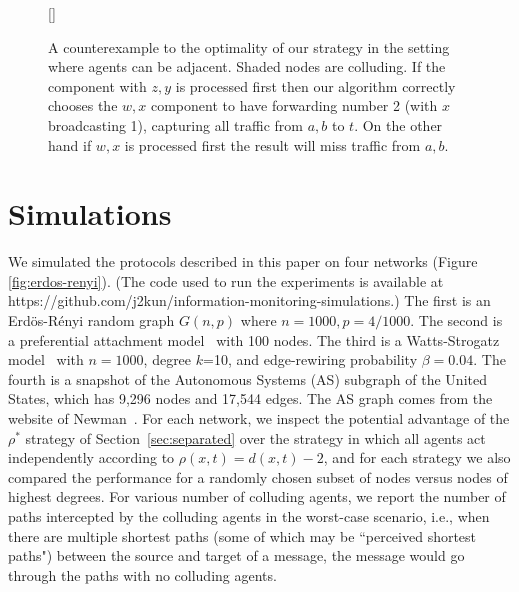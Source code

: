 \documentclass{comnet}
\begin{document}
\begin{figure}[h]
[\FBwidth]
{\caption{A counterexample to the optimality of our strategy in the setting
where agents can be adjacent. Shaded nodes are colluding. If the component with
$z,y$ is processed first then our algorithm correctly chooses the $w,x$
component to have forwarding number 2 (with $x$ broadcasting 1), capturing all
traffic from $a,b$ to $t$.  On the other hand if $w,x$ is processed first the
result will miss traffic from $a,b$.} \label{fig:forwarding-ctex}}
{} \end{figure}


\section{Simulations} \label{sec:simulations}
 
We simulated the protocols described in this paper on four networks (Figure \ref{fig:erdos-renyi}). (The code used to run the experiments is available at https://github.com/j2kun/information-monitoring-simulations.) The first is an Erd\"os-R\'enyi random graph $G(n, p)$ where $n = 1000, p = 4/1000$. The second is a preferential attachment model~\cite{BarabasiA99} with 100 nodes. The third is a Watts-Strogatz model~\cite{WattsS98} with $n=1000$, degree $k$=10, and edge-rewiring probability $\beta=0.04$. The fourth is a snapshot of the Autonomous Systems (AS) subgraph of the United States, which has 9,296 nodes and 17,544 edges. The AS graph comes from the website of Newman~\cite{Newman06}. For each network, we inspect the potential advantage of the $\rho^*$ strategy of Section~\ref{sec:separated} over the strategy in which all agents act independently according to $\rho(x,t) = d(x,t) - 2$, and for each strategy we also compared the performance for a randomly chosen subset of nodes versus nodes of highest degrees. For various number of colluding agents, we report the number of paths intercepted by the colluding agents in the worst-case scenario, i.e., when there are multiple  shortest paths (some of which may be ``perceived shortest paths") between the source and target of a message, the message would go through the paths with no colluding agents.
\end{document}

